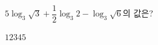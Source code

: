 $5\log_3\sqrt{3}+\dfrac{1}{2}\log_3 2-\log_3\sqrt{6}$의 값은?
\begin{choices32}{$1$}{$2$}{$3$}{$4$}{$5$}\end{choices32}

